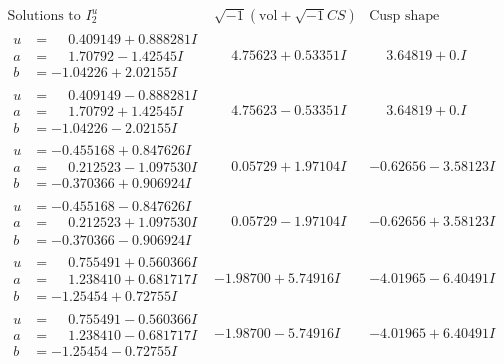 \documentclass[1p]{elsarticle_modified}
\theoremstyle{definition}
\newcommand{\I}{\sqrt{-1}}
\begin{document}
$$\begin{array}{c|c|c}  
\text{Solutions to }I^u_{2}& \I (\text{vol} + \sqrt{-1}CS) & \text{Cusp shape}\\
 \hline 
\begin{aligned}
u &= \phantom{-}0.409149 + 0.888281 I \\
a &= \phantom{-}1.70792 - 1.42545 I \\
b &= -1.04226 + 2.02155 I\end{aligned}
 & \phantom{-}4.75623 + 0.53351 I & \phantom{-}3.64819 + 0. I\phantom{ +0.000000I} \\ \hline\begin{aligned}
u &= \phantom{-}0.409149 - 0.888281 I \\
a &= \phantom{-}1.70792 + 1.42545 I \\
b &= -1.04226 - 2.02155 I\end{aligned}
 & \phantom{-}4.75623 - 0.53351 I & \phantom{-}3.64819 + 0. I\phantom{ +0.000000I} \\ \hline\begin{aligned}
u &= -0.455168 + 0.847626 I \\
a &= \phantom{-}0.212523 - 1.097530 I \\
b &= -0.370366 + 0.906924 I\end{aligned}
 & \phantom{-}0.05729 + 1.97104 I & -0.62656 - 3.58123 I \\ \hline\begin{aligned}
u &= -0.455168 - 0.847626 I \\
a &= \phantom{-}0.212523 + 1.097530 I \\
b &= -0.370366 - 0.906924 I\end{aligned}
 & \phantom{-}0.05729 - 1.97104 I & -0.62656 + 3.58123 I \\ \hline\begin{aligned}
u &= \phantom{-}0.755491 + 0.560366 I \\
a &= \phantom{-}1.238410 + 0.681717 I \\
b &= -1.25454 + 0.72755 I\end{aligned}
 & -1.98700 + 5.74916 I & -4.01965 - 6.40491 I \\ \hline\begin{aligned}
u &= \phantom{-}0.755491 - 0.560366 I \\
a &= \phantom{-}1.238410 - 0.681717 I \\
b &= -1.25454 - 0.72755 I\end{aligned}
 & -1.98700 - 5.74916 I & -4.01965 + 6.40491 I \\ \hline\begin{aligned}

\end{aligned}
\end{array}$$
\end{document}
